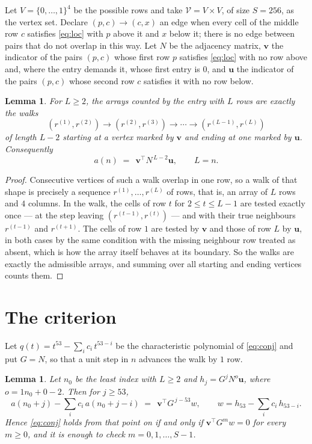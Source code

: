 \documentclass[11pt,a4paper]{article}
\theoremstyle{plain}
\newtheorem{lemma}[theorem]{Lemma}
\theoremstyle{definition}
\begin{document}
Let $V=\{0,\dots,1\}^{4}$ be the possible rows and take
$\mathcal V=V\times V$, of size $S=256$, as the vertex set. Declare $(p,c)\to(c,x)$ an edge
when every cell of the middle row $c$ satisfies \eqref{eq:loc} with $p$ above it and $x$
below it; there is no edge between pairs that do not overlap in this way. Let $N$ be the
adjacency matrix, $\mathbf{v}$ the indicator of the pairs $(p,c)$ whose first row $p$
satisfies \eqref{eq:loc} with no row above and, where the entry demands it, whose first entry is $0$, and $\mathbf{u}$ the indicator of
the pairs $(p,c)$ whose second row $c$ satisfies it with no row below.

\begin{lemma}\label{lem:walk}
For $L\ge2$, the arrays counted by the entry with $L$ rows are exactly the walks
\[
(r^{(1)},r^{(2)})\to(r^{(2)},r^{(3)})\to\cdots\to(r^{(L-1)},r^{(L)})
\]
of length $L-2$ starting at a vertex marked by $\mathbf{v}$ and ending at one marked by
$\mathbf{u}$. Consequently
\[
a(n)\;=\;\,\mathbf{v}^{\!\top}N^{\,L-2}\mathbf{u},\qquad L=n .
\]
\end{lemma}

\begin{proof}
Consecutive vertices of such a walk overlap in one row, so a walk of that shape is
precisely a sequence $r^{(1)},\dots,r^{(L)}$ of rows, that is, an array of $L$ rows
and $4$ columns. In the walk, the cells of row $t$ for $2\le t\le L-1$ are tested
exactly once --- at the step leaving $(r^{(t-1)},r^{(t)})$ --- and with their true
neighbours $r^{(t-1)}$ and $r^{(t+1)}$. The cells of row $1$ are tested by
$\mathbf{v}$ and those of row $L$ by $\mathbf{u}$, in both cases by the same condition
with the missing neighbour row treated as absent, which is how the array itself behaves at
its boundary. So the walks are exactly the admissible arrays, and summing over all starting
and ending vertices counts them.
\end{proof}

\section{The criterion}

Let $q(t)=t^{53}-\sum_i c_i\,t^{53-i}$ be the characteristic polynomial of
\eqref{eq:conj} and put $G=N$, so that a unit step in $n$ advances the walk by
$1$ row.

\begin{lemma}\label{lem:crit}
Let $n_0$ be the least index with $L\ge2$ and $h_j=G^{j}N^{o}\mathbf{u}$, where
$o=1n_0+0-2$. Then for $j\ge53$,
\[
a(n_0+j)-\sum_i c_i\,a(n_0+j-i)\;=\;\,\mathbf{v}^{\!\top}G^{\,j-53}w,
\qquad w=h_{53}-\sum_i c_i\,h_{53-i} .
\]
Hence \eqref{eq:conj} holds from that point on if and only if
$\mathbf{v}^{\!\top}G^{m}w=0$ for every $m\ge0$, and it is enough to check
$m=0,1,\dots,S-1$.
\end{lemma}
\end{document}
